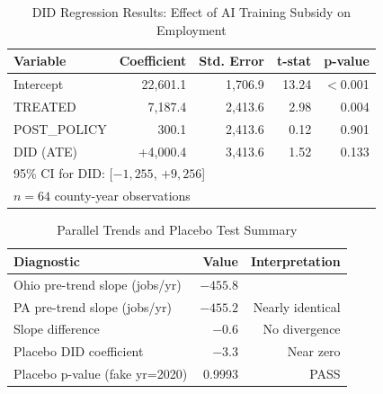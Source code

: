 \documentclass[12pt]{article}
\begin{document}
\begin{table}[H]
    \centering
    \caption{DID Regression Results: Effect of AI Training Subsidy on Employment}
    \begin{tabular}{lrrrr}
        \toprule
        \textbf{Variable} & \textbf{Coefficient} & \textbf{Std. Error} &
        \textbf{t-stat} & \textbf{p-value} \\
        \midrule
        Intercept      & 22,601.1 & 1,706.9 & 13.24 & $<$0.001 \\
        TREATED        & 7,187.4  & 2,413.6 &  2.98 & 0.004    \\
        POST\_POLICY   & 300.1    & 2,413.6 &  0.12 & 0.901    \\
        DID (ATE)      & +4,000.4 & 3,413.6 &  1.52 & 0.133    \\
        \midrule
        \multicolumn{5}{l}{95\% CI for DID: [$-1{,}255$, $+9{,}256$]} \\
        \multicolumn{5}{l}{$n = 64$ county-year observations} \\
        \bottomrule
    \end{tabular}
    \label{tab:did}
\end{table}

\begin{table}[H]
    \centering
    \caption{Parallel Trends and Placebo Test Summary}
    \begin{tabular}{lrr}
        \toprule
        \textbf{Diagnostic} & \textbf{Value} & \textbf{Interpretation} \\
        \midrule
        Ohio pre-trend slope (jobs/yr)  & $-455.8$ & \\
        PA pre-trend slope (jobs/yr)    & $-455.2$ & Nearly identical \\
        Slope difference                & $-0.6$   & No divergence \\
        \midrule
        Placebo DID coefficient         & $-3.3$   & Near zero \\
        Placebo p-value (fake yr=2020)  & 0.9993   & PASS \\
        \bottomrule
    \end{tabular}
    \label{tab:parallel}
\end{table}
\end{document}
